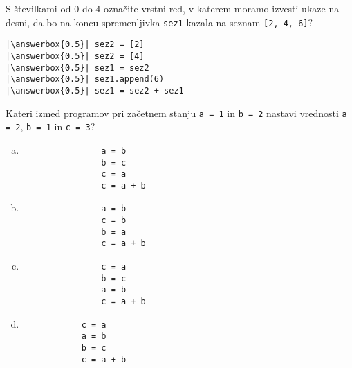 \documentclass[arhiv, 10pt]{../izpit}
\newcommand{\inlinepy}[1]{\texttt{#1}}
\newcommand{\answerbox}[1]{\framebox{\vphantom{\large M}\hspace{#1cm}}}
\begin{document}
        \naloga*
        \begin{multicols}{2}
        \noindent 
        S številkami od $0$ do $4$ označite vrstni red, v katerem moramo izvesti ukaze na desni, da bo na koncu spremenljivka \inlinepy{sez1} kazala na seznam \inlinepy{[2, 4, 6]}?
    
        \columnbreak
        \noindent
        \begin{verbatim}
|\answerbox{0.5}| sez2 = [2]
|\answerbox{0.5}| sez2 = [4]
|\answerbox{0.5}| sez1 = sez2
|\answerbox{0.5}| sez1.append(6)
|\answerbox{0.5}| sez1 = sez2 + sez1

        \end{verbatim}
        \end{multicols}
    
            
        \naloga*
        
        Kateri izmed programov pri začetnem stanju
            \inlinepy{a = 1} in
            \inlinepy{b = 2}
        nastavi vrednosti
            \inlinepy{a = 2},
            \inlinepy{b = 1} in
            \inlinepy{c = 3}?
    
        \begin{multicols}{4}
        \begin{enumerate}[(a)]
\item 
                \begin{verbatim}
                a = b
                b = c
                c = a
                c = a + b
                \end{verbatim}
            
\item 
                \begin{verbatim}
                a = b
                c = b
                b = a
                c = a + b
                \end{verbatim}
            
\item 
                \begin{verbatim}
                c = a
                b = c
                a = b
                c = a + b
                \end{verbatim}
            
\item 
            \begin{verbatim}
            c = a
            a = b
            b = c
            c = a + b
            \end{verbatim}
        
\end{enumerate}

        \end{multicols}
    
\end{document}
